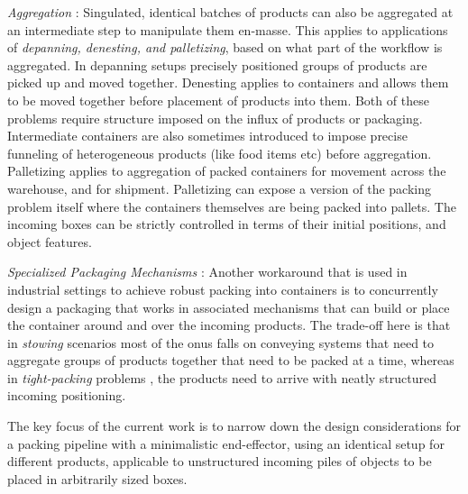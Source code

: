 {    \textit{Aggregation}
    : Singulated, identical batches of products can also be aggregated at an intermediate step to manipulate them en-masse. This applies to applications of \textit{depanning, denesting, and palletizing}, based on what part of the workflow is aggregated. In depanning setups precisely positioned groups of products are picked up and moved together. Denesting applies to containers and allows them to be moved together before placement of products into them. Both of these problems require structure imposed on the influx of products or packaging. Intermediate containers are also sometimes introduced to impose precise funneling of heterogeneous products (like food items etc) before aggregation. Palletizing
    applies to aggregation of packed containers for movement across the warehouse, and for shipment. Palletizing can expose a version of the packing problem itself where the containers themselves are being packed into pallets. The incoming boxes can be strictly controlled in terms of their initial positions, and object features.
    
    \textit{Specialized Packaging Mechanisms}
    : Another workaround that is used in industrial settings to achieve robust packing into containers is to concurrently design a packaging that works in associated mechanisms that can build or place the container around and over the incoming products. The trade-off here is that in \textit{stowing}
    scenarios most of the onus falls on conveying systems that need to aggregate groups of products together that need to be packed at a time, whereas in \textit{tight-packing} problems
    , the products need to arrive with neatly structured incoming positioning.

The key focus of the current work is to narrow down the design considerations for a packing pipeline with a minimalistic end-effector, using an identical setup for different products, applicable to unstructured incoming piles of objects to be placed in arbitrarily sized boxes. 

}
